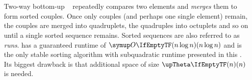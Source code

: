 \section{\texorpdfstring{\MS{}}{MergeSort}}
\label{sec:tasklet:merge}

Two-way bottom-up \MS{}~\cites{katajainen1997meticulous}[85\psq]{maurer1974datenstrukturen}[Chapter~2.3.1]{wirth1975algorithmen} repeatedly compares two elements and \emph{merges} them to form sorted couples.
Once only couples (and perhaps one single element) remain, the couples are merged into quadruplets, the quadruples into octuplets and so on until a single sorted sequence remains.
Sorted sequences are also referred to as \emph{runs}.
\MS{} has a guaranteed runtime of \(\bigoh{n \log n}\) and is the only stable sorting algorithm with subquadratic runtime presented in this .
Its biggest drawback is that additional space of size \(\bigtheta{n}\) is needed.






